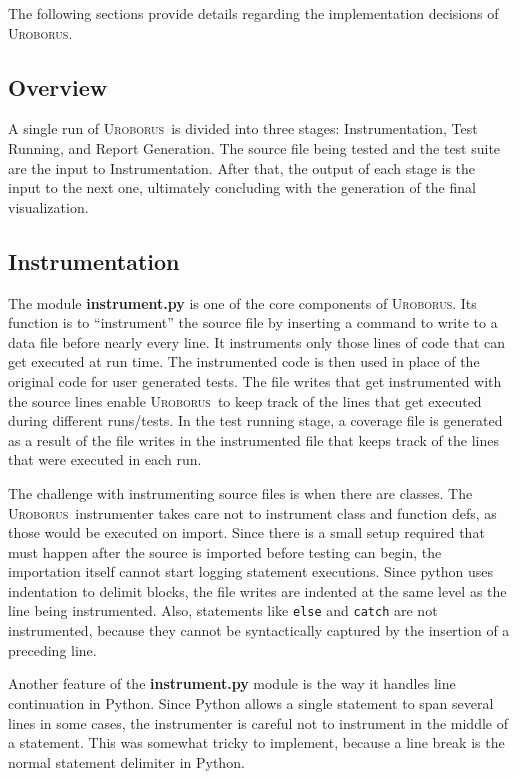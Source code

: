 \documentclass[english]{article}
\newcommand{\Uro}{\textsc{Uroborus}} \newcommand{\Taran}{\textsc{Tarantula}}
\begin{document}
The following sections provide details regarding the implementation decisions of \Uro.

\subsection{Overview}

A single run of \Uro\ is divided into three stages: Instrumentation, Test Running, and Report
Generation. The source file being tested and the test suite are the input to Instrumentation. After
that, the output of each stage is the input to the next one, ultimately concluding with the
generation of the final visualization.

\subsection{Instrumentation}

The module \textbf{instrument.py} is one of the core components of \Uro. Its function is to
``instrument''
the source file by inserting a command to write to a data file before nearly every line. 
It instruments only those lines of code that can get executed at
run time. The instrumented code is then used in place of the original code for user generated tests.
The file writes that get instrumented with the source lines enable \Uro\ to keep track of the lines
that get executed during different runs/tests. In the test running stage, a coverage file is
generated as a result of the file writes in the instrumented file that keeps track of the lines that
were executed in each run.

The challenge with instrumenting source files is when there are classes. The \Uro\ instrumenter
takes care not to instrument class and function defs, as those would be executed on import. 
Since there is a small setup required that must happen after the source is imported before testing
can begin, the importation itself cannot start logging statement executions.
Since python uses indentation to delimit
blocks, the file writes are indented at the same level as
the line being instrumented. Also, statements like \texttt{else} and \texttt{catch} are not
instrumented, because they cannot be syntactically captured by the insertion of a preceding line.

Another feature of the \textbf{instrument.py} module is the way it handles line continuation in Python. Since
Python allows a single statement to span several lines in some cases, the instrumenter is careful not to instrument
in the middle of a statement. This was somewhat tricky to implement, because a line break is the
normal statement delimiter in Python.
\end{document}
